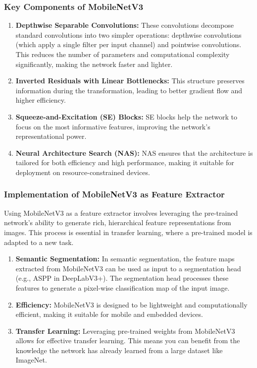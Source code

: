 \subsubsection{Key Components of MobileNetV3}
\begin{enumerate}
    \item \textbf{Depthwise Separable Convolutions: }These convolutions decompose standard convolutions into two simpler operations: depthwise convolutions (which apply a single filter per input channel) and pointwise convolutions.
    This reduces the number of parameters and computational complexity significantly, making the network faster and lighter.

    \item \textbf{Inverted Residuals with Linear Bottlenecks: }This structure preserves information during the transformation, leading to better gradient flow and higher efficiency.

    \item \textbf{Squeeze-and-Excitation (SE) Blocks: }SE blocks help the network to focus on the most informative features, improving the network’s representational power.
    \item \textbf{Neural Architecture Search (NAS): }NAS ensures that the architecture is tailored for both efficiency and high performance, making it suitable for deployment on resource-constrained devices.
\end{enumerate}

\subsubsection{Implementation of MobileNetV3 as Feature Extractor }
Using MobileNetV3 as a feature extractor involves leveraging the pre-trained network's ability to generate rich, hierarchical feature representations from images. This process is essential in transfer learning, where a pre-trained model is adapted to a new task.
\begin{enumerate}
    \item \textbf{Semantic Segmentation: }In semantic segmentation, the feature maps extracted from MobileNetV3 can be used as input to a segmentation head (e.g., ASPP in DeepLabV3+). The segmentation head processes these features to generate a pixel-wise classification map of the input image.
    \item \textbf{Efficiency: }MobileNetV3 is designed to be lightweight and computationally efficient, making it suitable for mobile and embedded devices.
    \item \textbf{Transfer Learning: }Leveraging pre-trained weights from MobileNetV3 allows for effective transfer learning. This means you can benefit from the knowledge the network has already learned from a large dataset like ImageNet.
\end{enumerate}

